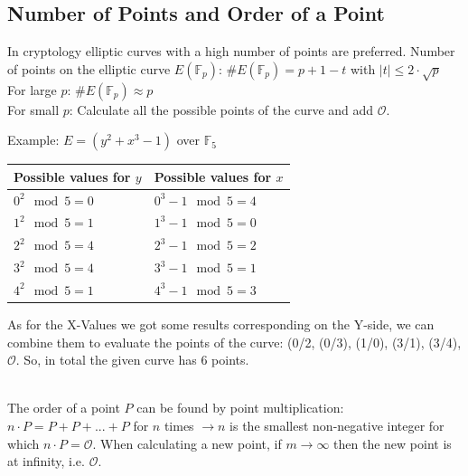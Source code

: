 \subsection{Number of Points and Order of a Point}
In cryptology elliptic curves with a high number of points are preferred.
Number of points on the elliptic curve $E(\mathbb{F}_p)$: $\#E(\mathbb{F}_p)=p+1-t$ with $|t| \leq 2 \cdot \sqrt{p}$ \\
For large $p$:  $\#E(\mathbb{F}_p) \approx p $ \\
For small $p$:  Calculate all the possible points of the curve and add $\mathcal{O}$.\\
\begin{minipage}{8cm}
	Example: $E=(y^2+x^3-1)$ over $\mathbb{F}_5$\\
	\begin{tabular}{|l |l|}
		\hline
		Possible values for $y$	&	Possible values for $x$\\
		\hline
		$0^2 \mod 5 = 0$		&	$0^3 - 1 \mod 5 = 4$\\
		\hline
		$1^2 \mod 5 = 1$		&	$1^3 - 1 \mod 5 = 0$\\
		\hline
		$2^2 \mod 5 = 4$		&	$2^3 - 1 \mod 5 = 2$\\
		\hline
		$3^2 \mod 5 = 4$		&	$3^3 - 1 \mod 5 = 1$\\
		\hline
		$4^2 \mod 5 = 1$		&	$4^3 - 1 \mod 5 = 3$\\
		\hline
	\end{tabular}
\end{minipage}
\begin{minipage}{10cm}
	As for the X-Values we got some results corresponding on the Y-side, we can combine them to evaluate the points of the curve: (0/2, (0/3), (1/0), (3/1), (3/4), $\mathcal{O}$.
	So, in total the given curve has 6 points.\\
\end{minipage}\\

The order of a point $P$ can be found by point multiplication: $n \cdot P=P+P+...+P$ for $n$ times $\to n$ is the smallest non-negative integer for which $n \cdot P=\mathcal{O}$. 
When calculating a new point, if $m\to \infty$ then the new point is at infinity, i.e. $\mathcal{O}$.\\


